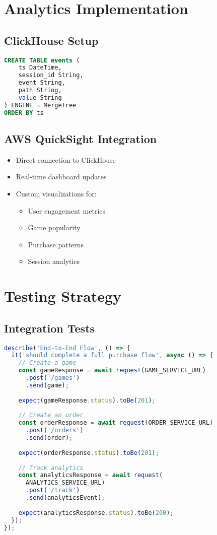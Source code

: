 \documentclass[12pt]{report}
\begin{document}
\chapter{Analytics Implementation}
\section{ClickHouse Setup}
\begin{lstlisting}[language=sql]
CREATE TABLE events (
    ts DateTime,
    session_id String,
    event String,
    path String,
    value String
) ENGINE = MergeTree
ORDER BY ts
\end{lstlisting}

\section{AWS QuickSight Integration}
\begin{itemize}
    \item Direct connection to ClickHouse
    \item Real-time dashboard updates
    \item Custom visualizations for:
        \begin{itemize}
            \item User engagement metrics
            \item Game popularity
            \item Purchase patterns
            \item Session analytics
        \end{itemize}
\end{itemize}

\chapter{Testing Strategy}
\section{Integration Tests}
\begin{lstlisting}[language=javascript]
describe('End-to-End Flow', () => {
  it('should complete a full purchase flow', async () => {
    // Create a game
    const gameResponse = await request(GAME_SERVICE_URL)
      .post('/games')
      .send(game);
    
    expect(gameResponse.status).toBe(201);
    
    // Create an order
    const orderResponse = await request(ORDER_SERVICE_URL)
      .post('/orders')
      .send(order);
    
    expect(orderResponse.status).toBe(201);
    
    // Track analytics
    const analyticsResponse = await request(
      ANALYTICS_SERVICE_URL)
      .post('/track')
      .send(analyticsEvent);
    
    expect(analyticsResponse.status).toBe(200);
  });
});
\end{lstlisting}
\end{document}
